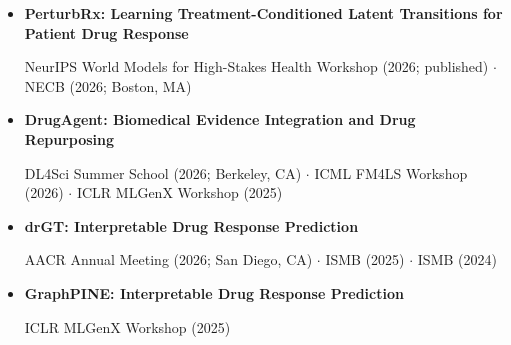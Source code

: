 \documentclass[11pt]{article}
\begin{document}
\begin{itemize}[leftmargin=*,itemsep=6pt,topsep=3pt]
    \item[] \textbf{PerturbRx: Learning Treatment-Conditioned Latent Transitions for Patient Drug Response}\par\nobreak
    {\small\color{CvMuted}NeurIPS World Models for High-Stakes Health Workshop (2026; published) $\cdot$ NECB (2026; Boston, MA)}

    \item[] \textbf{DrugAgent: Biomedical Evidence Integration and Drug Repurposing}\par\nobreak
    {\small\color{CvMuted}DL4Sci Summer School (2026; Berkeley, CA) $\cdot$ ICML FM4LS Workshop (2026) $\cdot$ ICLR MLGenX Workshop (2025)}

    \item[] \textbf{drGT: Interpretable Drug Response Prediction}\par\nobreak
    {\small\color{CvMuted}AACR Annual Meeting (2026; San Diego, CA) $\cdot$ ISMB (2025) $\cdot$ ISMB (2024)}

    \item[] \textbf{GraphPINE: Interpretable Drug Response Prediction}\par\nobreak
    {\small\color{CvMuted}ICLR MLGenX Workshop (2025)}
\end{itemize}



\newpage
{}
\begin{itemize}[leftmargin=*]
\end{itemize}
\end{document}
